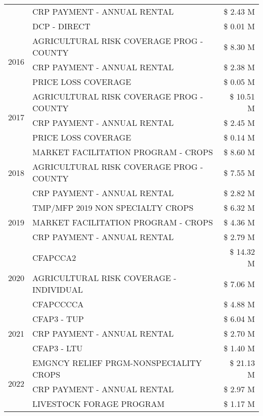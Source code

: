 \begin{tabular}{llr}
 & CRP PAYMENT - ANNUAL RENTAL & \$ 2.43 M \\
 & DCP - DIRECT & \$ 0.01 M \\
\cline{1-3}
\multirow[t]{3}{*}{2016} & AGRICULTURAL RISK COVERAGE PROG - COUNTY & \$ 8.30 M \\
 & CRP PAYMENT - ANNUAL RENTAL & \$ 2.38 M \\
 & PRICE LOSS COVERAGE & \$ 0.05 M \\
\cline{1-3}
\multirow[t]{3}{*}{2017} & AGRICULTURAL RISK COVERAGE PROG - COUNTY & \$ 10.51 M \\
 & CRP PAYMENT - ANNUAL RENTAL & \$ 2.45 M \\
 & PRICE LOSS COVERAGE & \$ 0.14 M \\
\cline{1-3}
\multirow[t]{3}{*}{2018} & MARKET FACILITATION PROGRAM - CROPS & \$ 8.60 M \\
 & AGRICULTURAL RISK COVERAGE PROG - COUNTY & \$ 7.55 M \\
 & CRP PAYMENT - ANNUAL RENTAL & \$ 2.82 M \\
\cline{1-3}
\multirow[t]{3}{*}{2019} & TMP/MFP 2019 NON SPECIALTY CROPS & \$ 6.32 M \\
 & MARKET FACILITATION PROGRAM - CROPS & \$ 4.36 M \\
 & CRP PAYMENT - ANNUAL RENTAL & \$ 2.79 M \\
\cline{1-3}
\multirow[t]{3}{*}{2020} & CFAPCCA2 & \$ 14.32 M \\
 & AGRICULTURAL RISK COVERAGE - INDIVIDUAL & \$ 7.06 M \\
 & CFAPCCCCA & \$ 4.88 M \\
\cline{1-3}
\multirow[t]{3}{*}{2021} & CFAP3 - TUP & \$ 6.04 M \\
 & CRP PAYMENT - ANNUAL RENTAL & \$ 2.70 M \\
 & CFAP3 - LTU & \$ 1.40 M \\
\cline{1-3}
\multirow[t]{3}{*}{2022} & EMGNCY RELIEF PRGM-NONSPECIALITY CROPS & \$ 21.13 M \\
 & CRP PAYMENT - ANNUAL RENTAL & \$ 2.97 M \\
 & LIVESTOCK FORAGE PROGRAM & \$ 1.17 M \\
\cline{1-3}
\bottomrule
\end{tabular}

